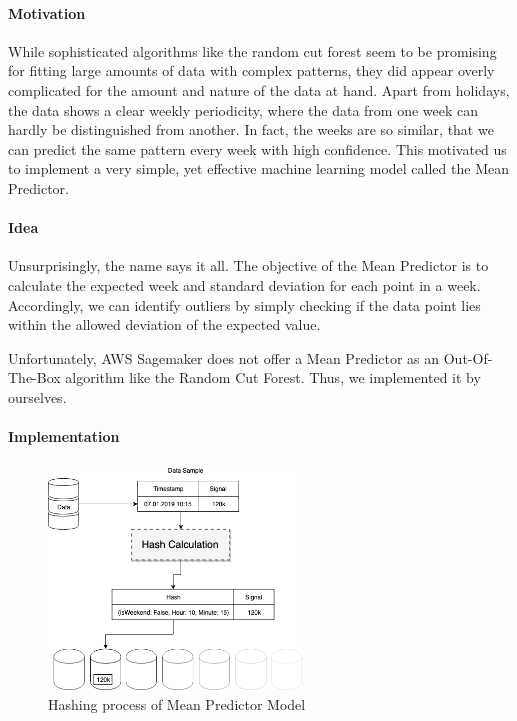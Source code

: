 \paragraph{Motivation}
While sophisticated algorithms like the random cut forest seem to be promising for fitting large amounts of data with complex patterns, they did appear overly complicated for the amount and nature of the data at hand. Apart from holidays, the data shows a clear weekly periodicity, where the data from one week can hardly be distinguished from another. In fact, the weeks are so similar, that we can predict the same pattern every week with high confidence. This motivated us to implement a very simple, yet effective machine learning model called the Mean Predictor.

\paragraph{Idea}
Unsurprisingly, the name says it all. The objective of the Mean Predictor is to calculate the expected week and standard deviation for each point in a week. Accordingly, we can identify outliers by simply checking if the data point lies within the allowed deviation of the expected value. 

Unfortunately, AWS Sagemaker does not offer a Mean Predictor as an Out-Of-The-Box algorithm like the Random Cut Forest. Thus, we implemented it by ourselves.

\paragraph{Implementation}

\begin{figure}
    \centering
    \includegraphics[width=0.6\textwidth]{images/mean_predictor_hashing.png}
    \caption{Hashing process of Mean Predictor Model}
    \label{fig:mean_predictor_hashing}
\end{figure}

